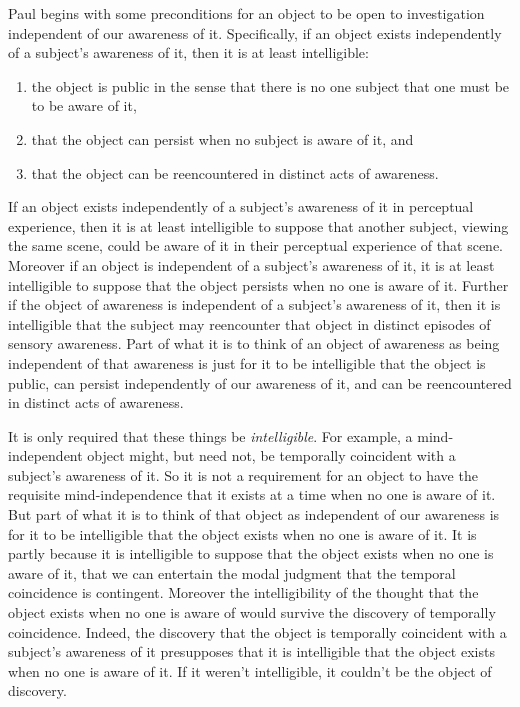 \documentclass[11pt]{article}
\begin{document}
Paul begins with some preconditions for an object to be open to investigation independent of our awareness of it. Specifically, if an object exists independently of a subject's awareness of it, then it is at least intelligible:
\begin{enumerate}
    \item the object is public in the sense that there is no one subject that one must be to be aware of it,
    \item that the object can persist when no subject is aware of it, and
    \item that the object can be reencountered in distinct acts of awareness.
\end{enumerate}
If an object exists independently of a subject's awareness of it in perceptual experience, then it is at least intelligible to suppose that another subject, viewing the same scene, could be aware of it in their perceptual experience of that scene. Moreover if an object is independent of a subject's awareness of it, it is at least intelligible to suppose that the object persists when no one is aware of it. Further if the object of awareness is independent of a subject's awareness of it, then it is intelligible that the subject may reencounter that object in distinct episodes of sensory awareness. Part of what it is to think of an object of awareness as being independent of that awareness is just for it to be intelligible that the object is public, can persist independently of our awareness of it, and can be reencountered in distinct acts of awareness. 

It is only required that these things be \emph{intelligible}. For example, a mind-independent object might, but need not, be temporally coincident with a subject's awareness of it. So it is not a requirement for an object to have the requisite mind-independence that it exists at a time when no one is aware of it. But part of what it is to think of that object as independent of our awareness is for it to be intelligible that the object exists when no one is aware of it. It is partly because it is intelligible to suppose that the object exists when no one is aware of it, that we can entertain the modal judgment that the temporal coincidence is contingent. Moreover the intelligibility of the thought that the object exists when no one is aware of would survive the discovery of temporally coincidence. Indeed, the discovery that the object is temporally coincident with a subject's awareness of it presupposes that it is intelligible that the object exists when no one is aware of it. If it weren't intelligible, it couldn't be the object of discovery. 
\end{document}
